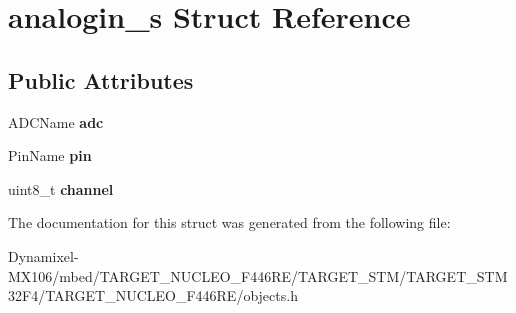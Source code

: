 \hypertarget{structanalogin__s}{}\section{analogin\+\_\+s Struct Reference}
\label{structanalogin__s}
\subsection*{Public Attributes}
\begin{DoxyCompactItemize}
\item 
A\+D\+C\+Name {\bfseries adc}\hypertarget{structanalogin__s_a9c7c4db18ddcb6e6ab6f388fbf5ecf20}{}\label{structanalogin__s_a9c7c4db18ddcb6e6ab6f388fbf5ecf20}

\item 
Pin\+Name {\bfseries pin}\hypertarget{structanalogin__s_aa55b6bb620905ce15041a479f3345636}{}\label{structanalogin__s_aa55b6bb620905ce15041a479f3345636}

\item 
uint8\+\_\+t {\bfseries channel}\hypertarget{structanalogin__s_aa2c0499ebd6e920250020a26a34c7587}{}\label{structanalogin__s_aa2c0499ebd6e920250020a26a34c7587}

\end{DoxyCompactItemize}


The documentation for this struct was generated from the following file\+:\begin{DoxyCompactItemize}
\item 
Dynamixel-\/\+M\+X106/mbed/\+T\+A\+R\+G\+E\+T\+\_\+\+N\+U\+C\+L\+E\+O\+\_\+\+F446\+R\+E/\+T\+A\+R\+G\+E\+T\+\_\+\+S\+T\+M/\+T\+A\+R\+G\+E\+T\+\_\+\+S\+T\+M32\+F4/\+T\+A\+R\+G\+E\+T\+\_\+\+N\+U\+C\+L\+E\+O\+\_\+\+F446\+R\+E/objects.\+h\end{DoxyCompactItemize}
